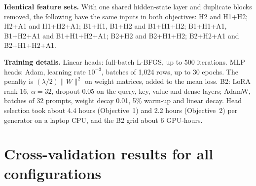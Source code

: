 \documentclass[10pt]{article}
\begin{document}
\textbf{Identical feature sets.} With one shared hidden-state layer and duplicate blocks removed, the following have
the same inputs in both objectives: H2 and H1+H2; H2+A1 and H1+H2+A1; B1+H1, B1+H2 and B1+H1+H2; B1+H1+A1, B1+H2+A1
and B1+H1+H2+A1; B2+H2 and B2+H1+H2; B2+H2+A1 and B2+H1+H2+A1.

\textbf{Training details.} Linear heads: full-batch L-BFGS, up to 500 iterations. MLP heads: Adam, learning rate
$10^{-3}$, batches of 1,024 rows, up to 30 epochs. The penalty is $(\lambda/2)\lVert W\rVert^2$ on weight matrices,
added to the mean loss. B2: LoRA rank 16, $\alpha=32$, dropout 0.05 on the query, key, value and dense layers; AdamW,
batches of 32 prompts, weight decay 0.01, 5\% warm-up and linear decay. Head selection took about 4.4 hours (Objective~1)
and 2.2 hours (Objective~2) per generator on a laptop CPU, and the B2 grid about 6 GPU-hours.

\begin{table}[H]
\centering\small
\caption{Selection of the hidden-state layer (on H1) and of the attention pooling (on A1) by cross-validation loss.
Objective~2 in units of $10^{-2}$. Bold: selected.}
\label{tab:layer}

\end{table}

\begin{table}[H]
\centering\small
\caption{B2 fine-tuning grid: cross-validation loss of the jointly trained head, used only to select the learning rate
and number of epochs (Objective~2 in units of $10^{-2}$). Bold: selected.}
\label{tab:b2}

\end{table}

\begin{table}[H]
\centering\small
\caption{Selected penalty strength $\lambda$ across the 23 configurations and the structure head, and what the loss
would be one grid step inwards for heads that selected an edge value.}
\label{tab:l2}

\end{table}

\clearpage
\section{Cross-validation results for all configurations}
\label{app:fullcv}

\begin{table}[H]
\centering\scriptsize
\caption{Llama 3.1 8B: selected head, cross-validation loss and standard deviation over the five folds for the four
references and all 23 configurations. Width: number of input features. Head: linear (lin) or MLP, penalty $\lambda$,
and the selected number of epochs for MLPs. The fold standard deviation mostly reflects folds that are harder for every
configuration, so it overstates the uncertainty of differences between rows.}
\setlength{\tabcolsep}{4pt}

\end{table}
\end{document}
